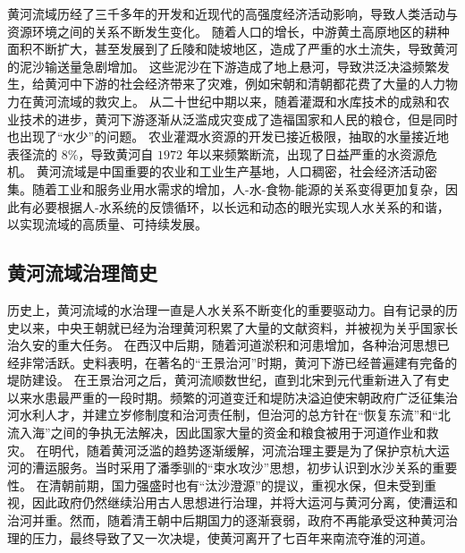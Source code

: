 黄河流域历经了三千多年的开发和近现代的高强度经济活动影响，导致人类活动与资源环境之间的关系不断发生变化\cite{fu2021a}。
随着人口的增长，中游黄土高原地区的耕种面积不断扩大，甚至发展到了丘陵和陡坡地区，造成了严重的水土流失，导致黄河的泥沙输送量急剧增加\cite{wu2020a}。
这些泥沙在下游造成了地上悬河，导致洪泛决溢频繁发生，给黄河中下游的社会经济带来了灾难，例如宋朝和清朝都花费了大量的人力物力在黄河流域的救灾上。
从二十世纪中期以来，随着灌溉和水库技术的成熟和农业技术的进步，黄河下游逐渐从泛滥成灾变成了造福国家和人民的粮仓，但是同时也出现了“水少”的问题。
农业灌溉水资源的开发已接近极限，抽取的水量接近地表径流的 $8\%$，导致黄河自 $1972$ 年以来频繁断流，出现了日益严重的水资源危机。
黄河流域是中国重要的农业和工业生产基地，人口稠密，社会经济活动密集。随着工业和服务业用水需求的增加，人-水-食物-能源的关系变得更加复杂，因此有必要根据人-水系统的反馈循环，以长远和动态的眼光实现人水关系的和谐，以实现流域的高质量、可持续发展。

\subsection{黄河流域治理简史}

历史上，黄河流域的水治理一直是人水关系不断变化的重要驱动力。自有记录的历史以来，中央王朝就已经为治理黄河积累了大量的文献资料，并被视为关乎国家长治久安的重大任务。
在西汉中后期，随着河道淤积和河患增加，各种治河思想已经非常活跃。史料表明，在著名的“王景治河”时期，黄河下游已经普遍建有完备的堤防建设\cite{WangWeiJing2009}。
在王景治河之后，黄河流顺数世纪，直到北宋到元代重新进入了有史以来水患最严重的一段时期。频繁的河道变迁和堤防决溢迫使宋朝政府广泛征集治河水利人才，并建立岁修制度和治河责任制，但治河的总方针在“恢复东流”和“北流入海”之间的争执无法解决，因此国家大量的资金和粮食被用于河道作业和救灾\cite{WangWeiJing2009, yang2019}。
在明代，随着黄河泛滥的趋势逐渐缓解，河流治理主要是为了保护京杭大运河的漕运服务。当时采用了潘季驯的“束水攻沙”思想，初步认识到水沙关系的重要性\cite{WangWeiJing2009}。
在清朝前期，国力强盛时也有“汰沙澄源”的提议，重视水保，但未受到重视，因此政府仍然继续沿用古人思想进行治理，并将大运河与黄河分离，使漕运和治河并重。然而，随着清王朝中后期国力的逐渐衰弱，政府不再能承受这种黄河治理的压力，最终导致了又一次决堤，使黄河离开了七百年来南流夺淮的河道\cite{WangWeiJing2009}。


